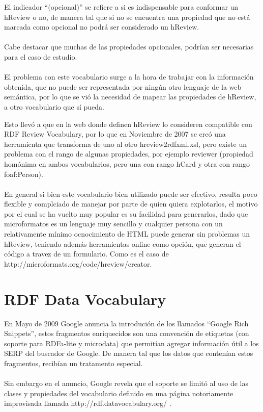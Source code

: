 El indicador ``(opcional)'' se refiere a si es indispensable para conformar un hReview o no, de manera tal que si no se encuentra una 
propiedad que no está marcada como opcional no podrá ser considerado un hReview.
\\\\
Cabe destacar que muchas de las propiedades opcionales, podrían ser necesarias para el caso de estudio.
\\\\
El problema con este vocabulario surge a la hora de trabajar con la información obtenida, que no puede ser representada por ningún otro 
lenguaje de la web semántica, por lo que se vió la necesidad de mapear las propiedades de hReview, a otro vocabulario que sí pueda.

Esto llevó a que en la web donde definen hReview lo consideren compatible con RDF Review Vocabulary, por lo que en Noviembre de 2007 
se creó una herramienta que transforma de uno al otro hreview2rdfxml.xsl,  pero existe un problema con el rango de algunas 
propiedades, por ejemplo reviewer (propiedad homónima en ambos vocabularios, pero una con rango hCard y otra con rango foaf:Person).
\\\\
En general si bien este vocabulario bien utilizado puede ser efectivo, resulta poco flexible y complciado de manejar por parte 
de quien quiera explotarlos, el motivo por el cual se ha vuelto muy popular es su facilidad para generarlos, dado que 
microformatos es un lenguaje muy sencillo y cualquier persona con un relativamente mínimo ocnocimiento de HTML puede generar 
sin problemas un hReview, teniendo además herramientas online como opción, que generan el código a travez de un formulario. 
Como es el caso de http://microformats.org/code/hreview/creator. 


\section{RDF Data Vocabulary}
\label{section:data-vocabulary}

En Mayo de 2009 Google anuncia la introdución de los llamados ``Google Rich Snippets'', estos fragmentos enriquecidos son una convención 
de etiquetas (con soporte para RDFa-lite y microdata) que permitían agregar información útil a los SERP del buscador de Google. De manera tal 
que los datos que contenían estos fragmentos, recibían un tratamento especial.
\\\\
Sin embargo en el anuncio, Google revela que el soporte se limitó al uso de las clases y propiedades del vocabulario definido en una página 
notoriamente improvisada llamada http://rdf.datavocabulary.org/ . 

